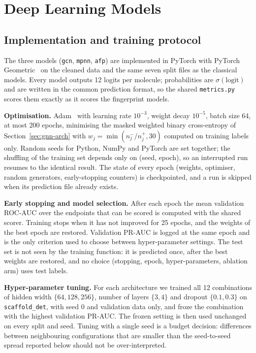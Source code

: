 \section{Deep Learning Models}
\label{sec:gnn-models}

\subsection{Implementation and training protocol}
The three models (\texttt{gcn}, \texttt{mpnn}, \texttt{afp}) are implemented in PyTorch with PyTorch Geometric~\cite{fey2019pyg} on the cleaned data and the same seven split files as the classical models. Every model outputs 12 logits per molecule; probabilities are $\sigma(\text{logit})$ and are written in the common prediction format, so the shared \texttt{metrics.py} scores them exactly as it scores the fingerprint models.

\textbf{Optimisation.} Adam~\cite{kingma2015adam} with learning rate $10^{-3}$, weight decay $10^{-5}$, batch size 64, at most 200 epochs, minimising the masked weighted binary cross-entropy of Section~\ref{sec:gnn-arch} with $w_j=\min(n_j^-/n_j^+,30)$ computed on training labels only. Random seeds for Python, NumPy and PyTorch are set together; the shuffling of the training set depends only on (seed, epoch), so an interrupted run resumes to the identical result. The state of every epoch (weights, optimiser, random generators, early-stopping counters) is checkpointed, and a run is skipped when its prediction file already exists.

\textbf{Early stopping and model selection.} After each epoch the mean validation ROC-AUC over the endpoints that can be scored is computed with the shared scorer. Training stops when it has not improved for 25 epochs, and the weights of the best epoch are restored. Validation PR-AUC is logged at the same epoch and is the only criterion used to choose between hyper-parameter settings. The test set is not seen by the training function: it is predicted once, after the best weights are restored, and no choice (stopping, epoch, hyper-parameters, ablation arm) uses test labels.

\textbf{Hyper-parameter tuning.} For each architecture we trained all 12 combinations of hidden width $\{64,128,256\}$, number of layers $\{3,4\}$ and dropout $\{0.1,0.3\}$ on \texttt{scaffold\_det}, with seed 0 and validation data only, and froze the combination with the highest validation PR-AUC. The frozen setting is then used unchanged on every split and seed. Tuning with a single seed is a budget decision: differences between neighbouring configurations that are smaller than the seed-to-seed spread reported below should not be over-interpreted.

